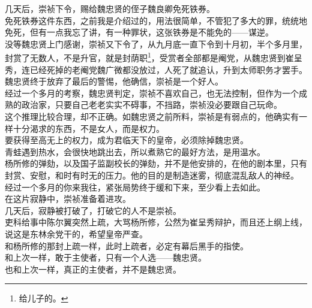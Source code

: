 \begin{multicols}{\theparacolNo}
几天后，崇祯下令，赐给魏忠贤的侄子魏良卿免死铁券。\\

免死铁券这件东西，之前我是介绍过的，用法很简单，不管犯了多大的罪，统统地免死，但有一点我忘了讲，有一种罪状，这张铁券是不能免的——谋逆。\\

没等魏忠贤上门感谢，崇祯又下令了，从九月底一直下令到十月初，半个多月里，封赏了无数人，不是升官，就是封荫职\footnote{给儿子的。}，受赏者全部都是阉党，从魏忠贤到崔呈秀，连已经死掉的老阉党魏广微都没放过，人死了就追认，升到太师职务才罢手。\\

魏忠贤终于放弃了最后的警惕，他确信，崇祯是一个好人。\\

经过一个多月的考察，魏忠贤判定，崇祯不喜欢自己，也无法控制，但作为一个成熟的政治家，只要自己老老实实不碍事，不挡路，崇祯没必要跟自己玩命。\\

这个推理比较合理，却不正确。如魏忠贤之前所料，崇祯是有弱点的，他确实有一样十分渴求的东西，不是女人，而是权力。\\

要获得至高无上的权力，成为君临天下的皇帝，必须除掉魏忠贤。\\

青蛙遇到热水，会很快地跳出去，所以煮熟它的最好方法，是用温水。\\

杨所修的弹劾，以及国子监副校长的弹劾，并不是他安排的，在他的剧本里，只有封赏、安慰，和时有时无的压力。他的目的是制造迷雾，彻底混乱敌人的神经。\\

经过一个多月的你来我往，紧张局势终于缓和下来，至少看上去如此。\\

在这片寂静中，崇祯准备着进攻。\\

几天后，寂静被打破了，打破它的人不是崇祯。\\

吏科给事中陈尔翼突然上疏，大骂杨所修，公然为崔呈秀辩护，而且还上纲上线，说这是东林余党干的，希望皇帝严查。\\

和杨所修的那封上疏一样，此时上疏者，必定有幕后黑手的指使。\\

和上次一样，敢于主使者，只有一个人选——魏忠贤。\\

也和上次一样，真正的主使者，并不是魏忠贤。\\


\end{multicols}

